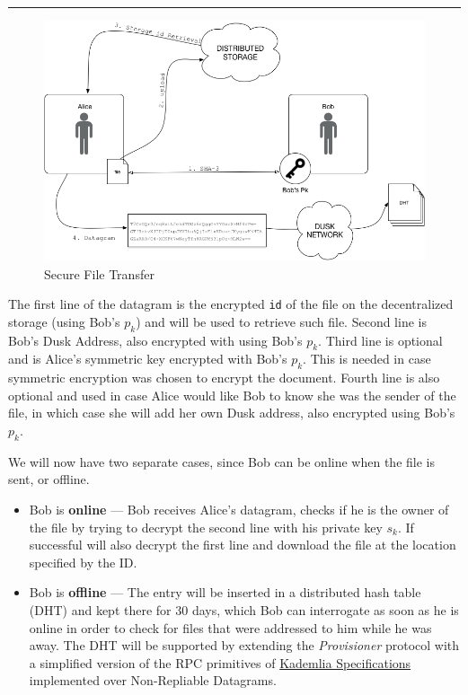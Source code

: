 \begin{center}\rule{0.5\linewidth}{\linethickness}\end{center} \begin{figure} \includegraphics[scale=0.20]{orc} \caption{Secure File Transfer} \label{orc} \end{figure} The first line of the datagram is the encrypted \texttt{id} of the file on the decentralized storage (using Bob's \(p_k\)) and will be used to retrieve such file. Second line is Bob's \textrm{Dusk} Address, also encrypted with using Bob's \(p_k\). Third line is optional and is Alice's symmetric key encrypted with Bob's \(p_k\). This is needed in case symmetric encryption was chosen to encrypt the document. Fourth line is also optional and used in case Alice would like Bob to know she was the sender of the file, in which case she will add her own \textrm{Dusk} address, also encrypted using Bob's \(p_k\).

We will now have two separate cases, since Bob can be online when the file is sent, or offline.

\begin{itemize}
\item
  Bob is \textbf{online} --- Bob receives Alice's datagram, checks if he is the owner of the file by trying to decrypt the second line with his private key \(s_k\). If successful will also decrypt the first line and download the file at the location specified by the ID.
\item
  Bob is \textbf{offline} --- The entry will be inserted in a distributed hash table (DHT) and kept there for 30 days, which Bob can interrogate as soon as he is online in order to check for files that were addressed to him while he was away. The DHT will be supported by extending the \emph{Provisioner} protocol with a simplified version of the RPC primitives of \href{http://xlattice.sourceforge.net/components/protocol/kademlia/specs.html\#protocol}{Kademlia Specifications} implemented over Non-Repliable Datagrams.
\end{itemize}